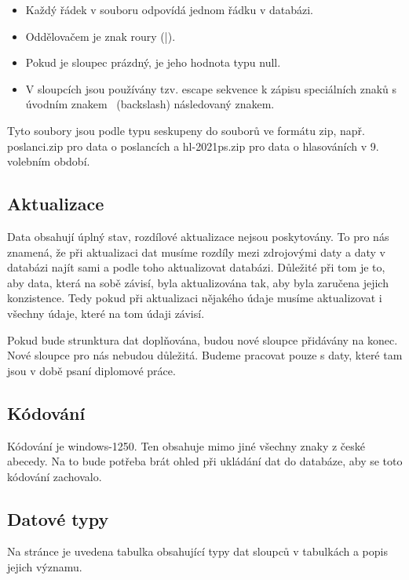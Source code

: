 \begin{itemize}
	\item Každý řádek v souboru odpovídá jednom řádku v databázi.
	\item Oddělovačem je znak roury (|).
	\item Pokud je sloupec prázdný, je jeho hodnota typu null.
	\item V sloupcích jsou používány tzv. escape sekvence k zápisu speciálních znaků s úvodním znakem \ (backslash) následovaný znakem.
\end{itemize}

Tyto soubory jsou podle typu seskupeny do souborů ve formátu zip, např. poslanci.zip pro data o poslancích a hl-2021ps.zip pro data o hlasováních v 9. volebním období.

\subsection{Aktualizace}

Data obsahují úplný stav, rozdílové aktualizace nejsou poskytovány. To pro nás znamená, že při aktualizaci dat musíme rozdíly mezi zdrojovými daty a daty v databázi najít sami a podle toho aktualizovat databázi. Důležité při tom je to, aby data, která na sobě závisí, byla aktualizována tak, aby byla zaručena jejich konzistence. Tedy pokud při aktualizaci nějakého údaje musíme aktualizovat i všechny údaje, které na tom údaji závisí.

Pokud bude strunktura dat doplňována, budou nové sloupce přidávány na konec. Nové sloupce pro nás nebudou důležitá. Budeme pracovat pouze s daty, které tam jsou v době psaní diplomové práce.

\subsection{Kódování}
Kódování je windows-1250. Ten obsahuje mimo jiné všechny znaky z české abecedy. Na to bude potřeba brát ohled při ukládání dat do databáze, aby se toto kódování zachovalo.

\subsection{Datové typy}
Na stránce je uvedena tabulka obsahující typy dat sloupců v tabulkách a popis jejich významu.

